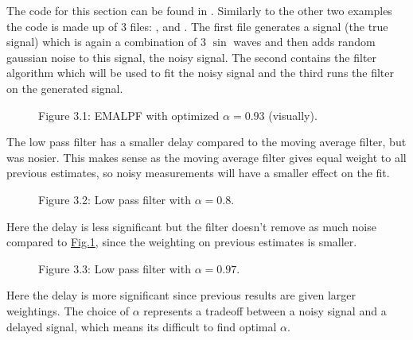 \documentclass[letterpaper,10pt,english]{jupyterBook}
\begin{document}
\sphinxAtStartPar
The code for this section can be found in . Similarly to the other two examples the code is made up of 3 files: ,  and . The first file generates a signal (the true signal) which is again a combination of 3 \(\sin\) waves and then adds random gaussian noise to this signal, the noisy signal. The second contains the filter algorithm which will be used to fit the noisy signal and the third runs the filter on the generated signal.

\begin{figure}[htbp]
\centering
\capstart

\noindent{}
\caption{Figure 3.1: EMALPF with optimized \(\alpha = 0.93\) (visually).}\label{\detokenize{1FilterBasics:fig-lowpass-vs-moving-average}}\end{figure}

\sphinxAtStartPar
The low pass filter has a smaller delay compared to the moving average filter, but was nosier. This makes sense as the moving average filter gives equal weight to all previous estimates, so noisy measurements will have a smaller effect on the fit.

\begin{figure}[htbp]
\centering
\capstart

\noindent{}
\caption{Figure 3.2: Low pass filter with \(\alpha = 0.8\).}\label{\detokenize{1FilterBasics:fig-lowpass-alpha-08}}\end{figure}

\sphinxAtStartPar
Here the delay is less significant but the filter doesn’t remove as much noise compared to \hyperref[\detokenize{1FilterBasics:fig-lowpass-vs-moving-average}]{Fig.\@ \ref{\detokenize{1FilterBasics:fig-lowpass-vs-moving-average}}}, since the weighting on previous estimates is smaller.

\begin{figure}[htbp]
\centering
\capstart

\noindent{}
\caption{Figure 3.3: Low pass filter with \(\alpha = 0.97\).}\label{\detokenize{1FilterBasics:fig-lowpass-alpha-095}}\end{figure}

\sphinxAtStartPar
Here the delay is more significant since previous results are given larger weightings. The choice of \(\alpha\) represents a tradeoff between a noisy signal and a delayed signal, which means its difficult to find optimal \(\alpha\).
\end{document}
